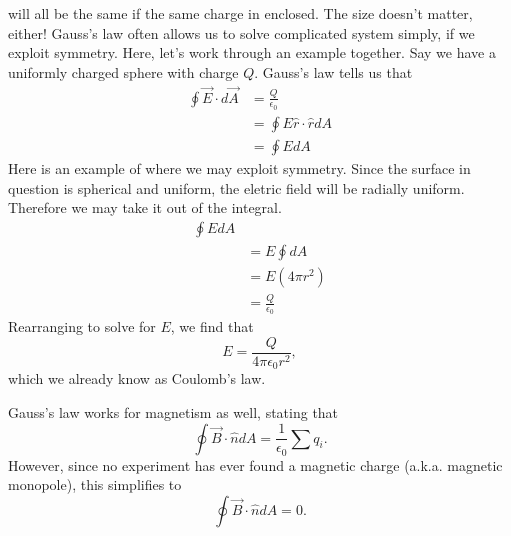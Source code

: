 \documentclass[nobib]{tufte-handout}
\begin{document}
will all be the same if the same charge in enclosed. 
The size doesn't matter, either! Gauss's law often
allows us to solve complicated system simply, if we 
exploit symmetry. Here, let's work through an example together. 
Say we have a uniformly charged sphere with charge $Q$. Gauss's law 
tells us that 
\begin{align*}
    \oint \vec{E} \cdot d\vec{A} &= \frac{Q}{\epsilon_0} \\
    &= \oint E \hat{r}\cdot \hat{r} dA \\
    &= \oint EdA
\end{align*}
Here is an example of where we may exploit symmetry. Since the 
surface in question is spherical and uniform, the eletric field 
will be radially uniform. Therefore we 
may take it out of the integral. 
\begin{align*}
    \oint EdA \\
    &= E \oint dA \\
    &= E(4 \pi r^2) \\
    &= \frac{Q}{\epsilon_0}
\end{align*}
Rearranging to solve for $E$, we find that 
\[E = \frac{Q}{4\pi \epsilon_0 r^2},\]
which we already know as Coulomb's law. 

Gauss's law works for magnetism as well, stating that 
\[\oint \vec{B} \cdot \hat{n} dA = \frac{1}{\epsilon_0} \sum q_i.\]
However, since no experiment has ever found 
a magnetic charge (a.k.a. magnetic monopole), 
this simplifies to 
\[\oint \vec{B} \cdot \hat{n} dA = 0.\]
\end{document}
